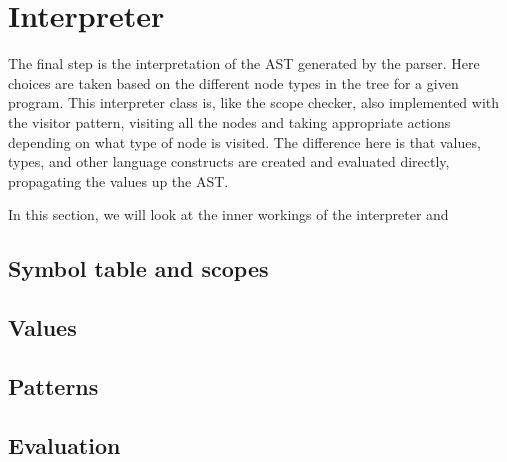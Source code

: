 \section{Interpreter}
The final step is the interpretation of the AST generated by the parser.
Here choices are taken based on the different node types in the tree
for a given program. This interpreter class is, like the scope checker,
also implemented with the visitor pattern, visiting all the nodes and
taking appropriate actions depending on what type of node is visited.
The difference here is that values, types, and other language constructs
are created and evaluated directly, propagating the values up the AST.

In this section, we will look at the inner workings of the interpreter and 

\subsection{Symbol table and scopes}

\subsection{Values}


\subsection{Patterns}

\subsection{Evaluation}
